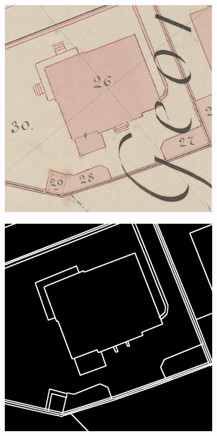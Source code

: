 \documentclass[12pt]{article}
\begin{document}
\begin{figure}[H]
    \begin{subfigure}[b]{.28\textwidth}
		\begin{minipage}[t]{1\linewidth}
			\centering
			\includegraphics[width=1\linewidth]{images/patches/img7.png}
		\end{minipage}
	\end{subfigure}
	\begin{subfigure}[b]{.28\textwidth}
		\begin{minipage}[t]{1\linewidth}
			\centering
			\includegraphics[width=1\linewidth]{images/patches/gt7.png}

\end{minipage}
\end{subfigure}
\end{figure}
\end{document}
